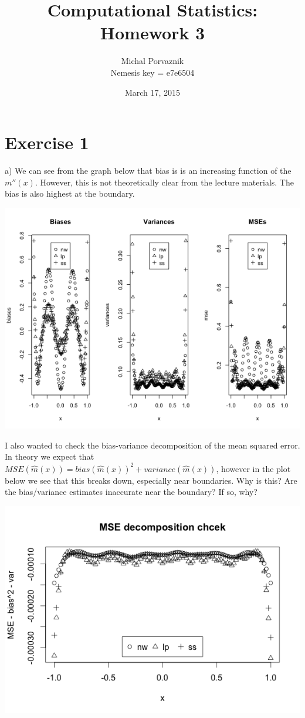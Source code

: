 \documentclass[a4paper,12pt]{article}
\begin{document}
\title{\textbf{Computational Statistics: Homework 3}}
\author{Michal Porvaznik \\ Nemesis key = e7e6504}
\date{March 17, 2015}
\maketitle
%
\section*{Exercise 1}
%
a) We can see from the graph below that bias is is an increasing function of the $m''(x)$. However, this is not theoretically clear from the lecture materials. The bias is also highest at the boundary.

\includegraphics[scale = 0.75]{hmw3_plot1.png}

I also wanted to check the bias-variance decomposition of the mean squared error. In theory we expect that $MSE(\hat{m}(x)) = bias(\hat{m}(x))^2 + variance(\hat{m}(x))$, however in the plot below we see that this breaks down, especially near boundaries. Why is this? Are the bias/variance estimates inaccurate near the boundary? If so, why?

\includegraphics[scale = 0.75]{hmw3_plot2.png}
\end{document}

